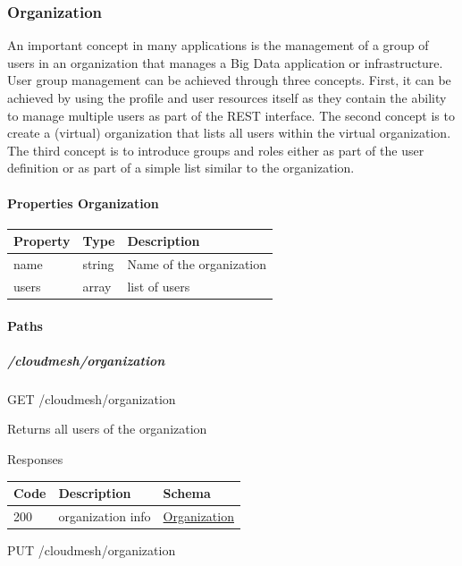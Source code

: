 \documentclass[9pt,]{article}
\let\oldparagraph\paragraph
\renewcommand{\paragraph}[1]{\oldparagraph{#1}\mbox{}}
\let\oldsubparagraph\subparagraph
\renewcommand{\subparagraph}[1]{\oldsubparagraph{#1}\mbox{}}
\begin{document}
\hypertarget{organization}{%
\subsubsection{Organization}\label{organization}}

An important concept in many applications is the management of a group
of users in an organization that manages a Big Data application or
infrastructure. User group management can be achieved through three
concepts. First, it can be achieved by using the profile and user
resources itself as they contain the ability to manage multiple users as
part of the REST interface. The second concept is to create a (virtual)
organization that lists all users within the virtual organization. The
third concept is to introduce groups and roles either as part of the
user definition or as part of a simple list similar to the organization.

\hypertarget{properties-organization}{%
\paragraph{Properties Organization}\label{properties-organization}}

\begin{longtable}[]{@{}lll@{}}
\toprule
Property & Type & Description\tabularnewline
\midrule
\endhead
name & string & Name of the organization\tabularnewline
users & array & list of users\tabularnewline
\bottomrule
\end{longtable}

\hypertarget{paths-1}{%
\paragraph{Paths}\label{paths-1}}

\hypertarget{cloudmeshorganization}{%
\subparagraph{/cloudmesh/organization}\label{cloudmeshorganization}}

GET /cloudmesh/organization

Returns all users of the organization

Responses

\begin{longtable}[]{@{}lll@{}}
\toprule
Code & Description & Schema\tabularnewline
\midrule
\endhead
200 & organization info &
\protect\hyperlink{organization}{Organization}\tabularnewline
\bottomrule
\end{longtable}

PUT /cloudmesh/organization
\end{document}
